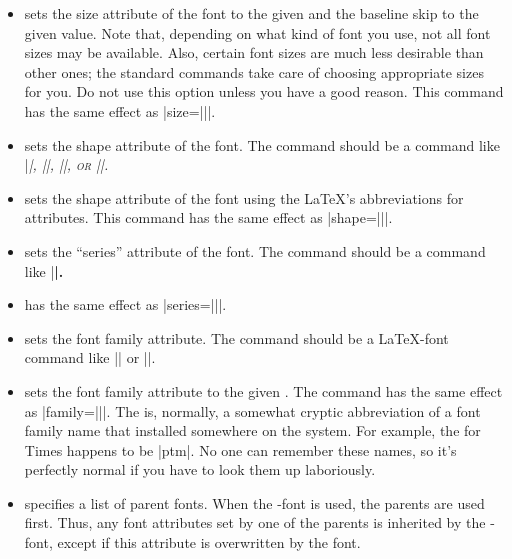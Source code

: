 \begin{command}{\setbeamerfont\opt{|*|}}
\begin{itemize}
    Note that there is a difference between specifying an empty command and specifying |\normalsize|: Making the size attribute ``empty'' means that the font size should not be changed when this font is used, while specifying |\normalsize| means that the size should be set to the normal size whenever this font is used.
  \item {} sets the size attribute of the font to the given  and the baseline skip to the given value. Note that, depending on what kind of font you use, not all font sizes may be available. Also, certain font sizes are much less desirable than other ones; the standard commands take care of choosing appropriate sizes for you. Do not use this option unless you have a good reason. This command has the same effect as |size={\fontsize||}|.
  \item {} sets the shape attribute of the font. The command should be a command like |\itshape|, |\slshape|, |\scshape|, or |\upshape|.
  \item {} sets the shape attribute of the font using the \LaTeX's abbreviations for attributes. This command has the same effect as |shape={\fontshape||}|.
  \item {} sets the ``series'' attribute of the font. The command should be a command like |\bfseries|.
  \item {} has the same effect as |series={\fontseries||}|.
  \item {} sets the font family attribute. The command should be a \LaTeX-font command like |\rmfamily| or |\sffamily|.
  \item {} sets the font family attribute to the given . The command has the same effect as |family={\fontfamily||}|. The  is, normally, a somewhat cryptic abbreviation of a font family name that installed somewhere on the system. For example, the  for Times happens to be |ptm|. No one can remember these names, so it's perfectly normal if you have to look them up laboriously.
  \item {} specifies a list of parent fonts. When the \beamer-font is used, the parents are used first. Thus, any font attributes set by one of the parents is inherited by the \beamer-font, except if this attribute is overwritten by the font.
  \end{itemize}


\end{command}

